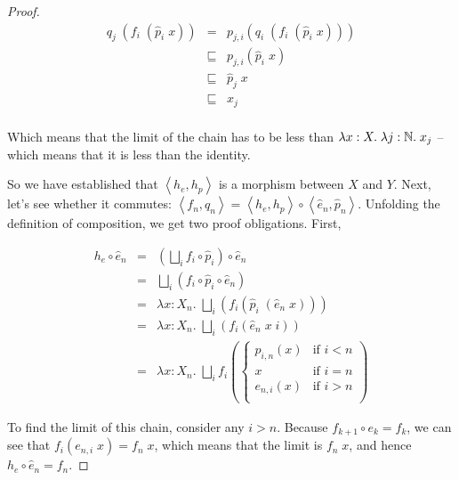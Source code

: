 \begin{proof}
\begin{displaymath}
  \begin{array}{lcl}
   q_j\; (f_i\;(\hat{p}_i\;x))
     & = & p_{j,i}(q_i\; (f_i\;(\hat{p}_i\;x))) \\
     & \sqsubseteq & p_{j,i}(\hat{p}_i\;x) \\
     & \sqsubseteq & \hat{p}_j\;x \\
     & \sqsubseteq & x_j \\
  \end{array}
\end{displaymath}

Which means that the limit of the chain has to be less than 
$\lambda x:X.\;\lambda j:\mathbb{N}.\;x_j$ -- which means that it is less
than the identity.


So we have established that $\left<h_e,h_p\right>$ is a morphism
between $X$ and $Y$. Next, let's see whether it commutes:
$\left<f_n,q_n\right> = \left<h_e,h_p\right> \circ \left<\hat{e}_n,
\hat{p}_n\right>$. Unfolding the definition of composition, we 
get two proof obligations. First, 

\begin{displaymath}
\begin{array}{lcl}
   h_e \circ \hat{e}_n 
   & = & 
     (\bigsqcup_i f_i \circ \hat{p}_i) \circ \hat{e}_n 
\\
   & = & 
     \bigsqcup_i (f_i \circ \hat{p}_i \circ \hat{e}_n)
\\
   & = & 
     \lambda x:X_n.\; \bigsqcup_i (f_i (\hat{p}_i \; (\hat{e}_n\;x)))
\\
   & = & 
     \lambda x:X_n.\; \bigsqcup_i (f_i (\hat{e}_n\;x\;i))
\\
   & = & 
     \lambda x:X_n.\; \bigsqcup_i f_i 
       (\left\{ 
          \begin{array}{ll}
            p_{i,n}(x) & \mbox{if } i < n \\
            x         & \mbox{if } i = n \\
            e_{n,i}(x) & \mbox{if } i > n \\
          \end{array}
       \right.)
\end{array}
\end{displaymath}

To find the limit of this chain, consider any $i > n$. Because $f_{k+1} \circ e_k = f_k$, 
we can see that $f_i(e_{n,i}\;x) = f_n\;x$, which means that the limit is $f_n\;x$, and
hence $h_e \circ \hat{e}_n = f_n$. 


\end{proof}
